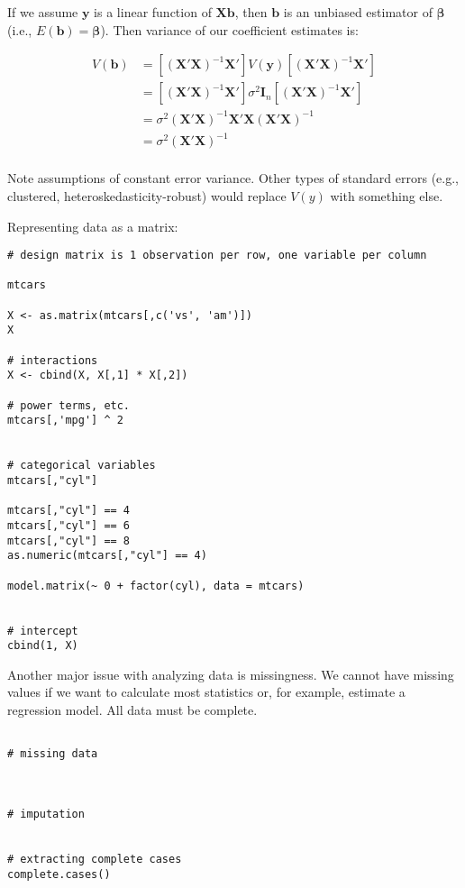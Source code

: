 \documentclass[a4paper,12pt]{article}
\newcommand{\matr}[1]{\mathbf{#1}}
\begin{document}
If we assume $\matr{y}$ is a linear function of $\matr{X}\matr{b}$, then $\matr{b}$ is an unbiased estimator of $\matr{\beta}$ (i.e., $E(\matr{b}) = \matr{\beta}$). Then variance of our coefficient estimates is:

\begin{align*}
V(\matr{b}) & = \left[(\matr{X}'\matr{X})^{-1}\matr{X}'\right] V(\matr{y}) \left[(\matr{X}'\matr{X})^{-1}\matr{X}'\right] \\
  & = \left[(\matr{X}'\matr{X})^{-1}\matr{X}'\right] \sigma^2 \matr{I}_n \left[(\matr{X}'\matr{X})^{-1}\matr{X}'\right] \\
  & = \sigma^2 (\matr{X}'\matr{X})^{-1}\matr{X}'\matr{X}(\matr{X}'\matr{X})^{-1}\\
  & = \sigma^2 (\matr{X}'\matr{X})^{-1}\\
\end{align*}

Note assumptions of constant error variance. Other types of standard errors (e.g., clustered, heteroskedasticity-robust) would replace $V(y)$ with something else.




Representing data as a matrix:

\begin{lstlisting}
# design matrix is 1 observation per row, one variable per column

mtcars

X <- as.matrix(mtcars[,c('vs', 'am')])
X

# interactions
X <- cbind(X, X[,1] * X[,2])

# power terms, etc.
mtcars[,'mpg'] ^ 2


# categorical variables
mtcars[,"cyl"]

mtcars[,"cyl"] == 4
mtcars[,"cyl"] == 6
mtcars[,"cyl"] == 8
as.numeric(mtcars[,"cyl"] == 4)

model.matrix(~ 0 + factor(cyl), data = mtcars)


# intercept
cbind(1, X)

\end{lstlisting}


Another major issue with analyzing data is missingness. We cannot have missing values if we want to calculate most statistics or, for example, estimate a regression model. All data must be complete.

\begin{lstlisting}

# missing data



# imputation


# extracting complete cases
complete.cases()


\end{lstlisting}
\end{document}
